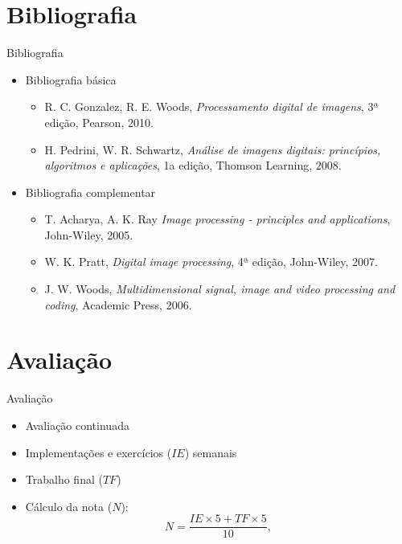    \section[ slide = false ]{Bibliografia}
   \begin{slide}[toc=]{Bibliografia}
      \begin{itemize}
       \item Bibliografia básica
       \begin{itemize}
          \item R. C. Gonzalez, R. E. Woods, \emph{Processamento digital de imagens}, 3ª edição, Pearson, 2010.
          \item H. Pedrini, W. R. Schwartz, \emph{Análise de imagens digitais: princípios, algoritmos e aplicações}, 1a edição, Thomson Learning, 2008.
       \end{itemize}
       \item Bibliografia complementar
       \begin{itemize}
          \item T. Acharya, A. K. Ray \emph{Image processing - principles and applications}, John-Wiley,  2005.
          \item W. K. Pratt, \emph{Digital image processing}, 4ª edição, John-Wiley,  2007.
          \item J. W. Woods, \emph{Multidimensional signal, image and video processing and coding}, Academic Press,  2006.
       \end{itemize}
      \end{itemize}
   \end{slide}
   
   \section[ slide = false ]{Avaliação}
      \begin{slide}[toc=]{Avaliação}
         \begin{itemize}[type=1]
            \item Avaliação continuada%
            \item Implementações e exercícios ($IE$) semanais%
            \item Trabalho final ($TF$)%
            \item Cálculo da nota ($N$):
            \begin{equation*}
               N=\frac{IE \times 5 + TF\times 5}{10},
            \end{equation*}
          \end{itemize}
      \end{slide}


